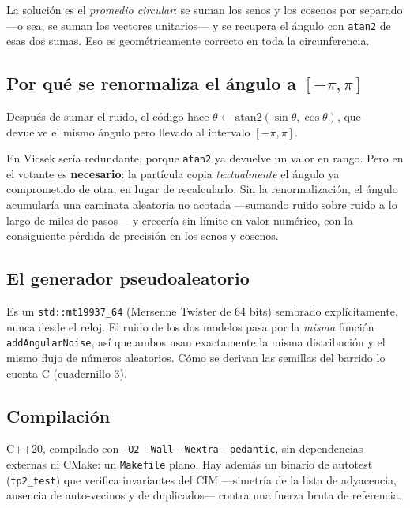 \documentclass[11pt]{article}
\begin{document}
La solución es el \emph{promedio circular}: se suman los senos y los cosenos por
separado ---o sea, se suman los vectores unitarios--- y se recupera el ángulo
con \texttt{atan2} de esas dos sumas. Eso es geométricamente correcto en toda la
circunferencia.

\subsection{Por qué se renormaliza el ángulo a $[-\pi, \pi]$}

Después de sumar el ruido, el código hace
$\theta \leftarrow \mathrm{atan2}(\sin\theta, \cos\theta)$, que devuelve el
mismo ángulo pero llevado al intervalo $[-\pi, \pi]$.

En Vicsek sería redundante, porque \texttt{atan2} ya devuelve un valor en rango.
Pero en el votante es \textbf{necesario}: la partícula copia \emph{textualmente}
el ángulo ya comprometido de otra, en lugar de recalcularlo. Sin la
renormalización, el ángulo acumularía una caminata aleatoria no acotada
---sumando ruido sobre ruido a lo largo de miles de pasos--- y crecería sin
límite en valor numérico, con la consiguiente pérdida de precisión en los senos
y cosenos.

\subsection{El generador pseudoaleatorio}

Es un \texttt{std::mt19937\_64} (Mersenne Twister de 64 bits) sembrado
explícitamente, nunca desde el reloj. El ruido de los dos modelos pasa por la
\emph{misma} función \texttt{addAngularNoise}, así que ambos usan exactamente la
misma distribución y el mismo flujo de números aleatorios. Cómo se derivan las
semillas del barrido lo cuenta C (cuadernillo 3).

\subsection{Compilación}

C++20, compilado con \texttt{-O2 -Wall -Wextra -pedantic}, sin dependencias
externas ni CMake: un \texttt{Makefile} plano. Hay además un binario de
autotest (\texttt{tp2\_test}) que verifica invariantes del CIM ---simetría de la
lista de adyacencia, ausencia de auto-vecinos y de duplicados--- contra una
fuerza bruta de referencia.

\end{document}
